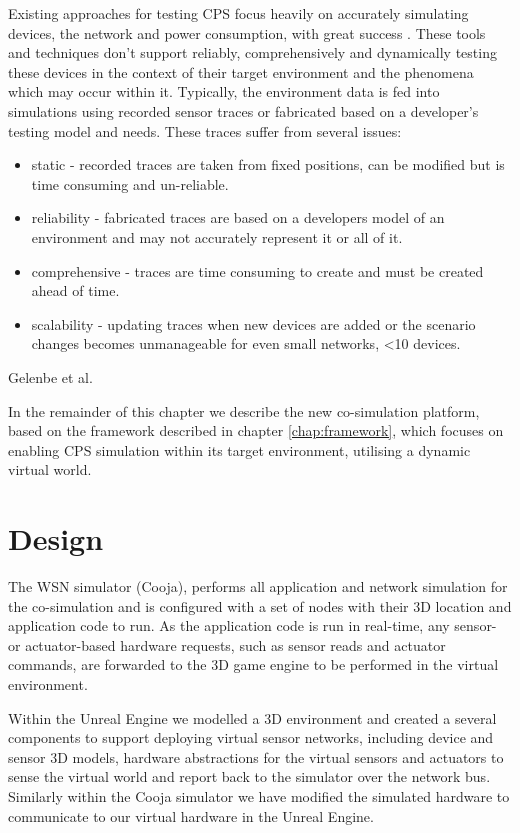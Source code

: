 Existing approaches for testing CPS focus heavily on accurately simulating devices, the network and power consumption, with great success \cite{cooja, tossim}.
These tools and techniques don't support reliably, comprehensively and dynamically testing these devices in the context of their target environment and the phenomena which may occur within it. Typically, the environment data is fed into simulations using recorded sensor traces or fabricated based on a developer's testing model and needs. These traces suffer from several issues:
\begin{itemize}
  \item static - recorded traces are taken from fixed positions, can be modified but is time consuming and un-reliable.
  \item reliability - fabricated traces are based on a developers model of an environment and may not accurately represent it or all of it.
  \item comprehensive - traces are time consuming to create and must be created ahead of time.
  \item scalability - updating traces when new devices are added or the scenario changes becomes unmanageable for even small networks, <10 devices.
\end{itemize}

Gelenbe et al.\cite{}

In the remainder of this chapter we describe the new co-simulation platform, based on the framework described in chapter \ref{chap:framework}, which focuses on enabling CPS simulation within its target environment, utilising a dynamic virtual world. 


\section{Design}
\label{sec:Design}

The WSN simulator (Cooja), performs all application and network simulation for the co-simulation and is configured with a set of nodes with their 3D location and application code to run. As the application code is run in real-time, any sensor- or actuator-based hardware requests, such as sensor reads and actuator commands, are forwarded to the 3D game engine to be performed in the virtual environment.

Within the Unreal Engine we modelled a 3D environment and created a several components to support deploying virtual sensor networks, including device and sensor 3D models, hardware abstractions for the virtual sensors and actuators to sense the virtual world and report back to the simulator over the network bus. Similarly within the Cooja simulator we have modified the simulated hardware to communicate to our virtual hardware in the Unreal Engine.

